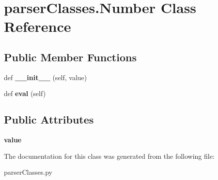 \hypertarget{classparser_classes_1_1_number}{}\section{parser\+Classes.\+Number Class Reference}
\label{classparser_classes_1_1_number}
\subsection*{Public Member Functions}
\begin{DoxyCompactItemize}
\item 
def {\bfseries \+\_\+\+\_\+init\+\_\+\+\_\+} (self, value)\hypertarget{classparser_classes_1_1_number_a556755d9d147b3264b9bf21915166ca1}{}\label{classparser_classes_1_1_number_a556755d9d147b3264b9bf21915166ca1}

\item 
def {\bfseries eval} (self)\hypertarget{classparser_classes_1_1_number_ae310cf63d3a1f2e2767189633be8f5ba}{}\label{classparser_classes_1_1_number_ae310cf63d3a1f2e2767189633be8f5ba}

\end{DoxyCompactItemize}
\subsection*{Public Attributes}
\begin{DoxyCompactItemize}
\item 
{\bfseries value}\hypertarget{classparser_classes_1_1_number_ae074c9227b38acb758a77d2f28d644bd}{}\label{classparser_classes_1_1_number_ae074c9227b38acb758a77d2f28d644bd}

\end{DoxyCompactItemize}


The documentation for this class was generated from the following file\+:\begin{DoxyCompactItemize}
\item 
parser\+Classes.\+py\end{DoxyCompactItemize}
